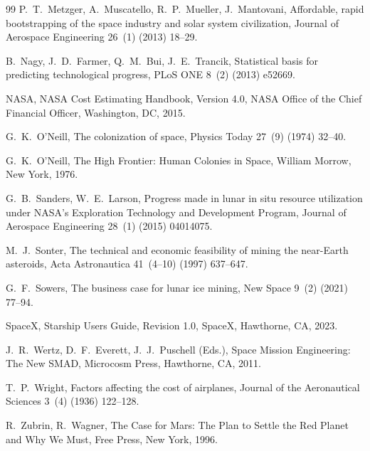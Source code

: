 \documentclass[preprint,12pt]{elsarticle}
\begin{document}
\begin{thebibliography}{99}
P.~T.~Metzger, A.~Muscatello, R.~P.~Mueller, J.~Mantovani,
\newblock Affordable, rapid bootstrapping of the space industry and solar system civilization,
\newblock Journal of Aerospace Engineering 26~(1) (2013) 18--29.

B.~Nagy, J.~D.~Farmer, Q.~M.~Bui, J.~E.~Trancik,
\newblock Statistical basis for predicting technological progress,
\newblock PLoS ONE 8~(2) (2013) e52669.

NASA,
\newblock NASA Cost Estimating Handbook, Version 4.0,
\newblock NASA Office of the Chief Financial Officer, Washington, DC, 2015.

G.~K.~O'Neill,
\newblock The colonization of space,
\newblock Physics Today 27~(9) (1974) 32--40.

G.~K.~O'Neill,
\newblock The High Frontier: Human Colonies in Space,
\newblock William Morrow, New York, 1976.

G.~B.~Sanders, W.~E.~Larson,
\newblock Progress made in lunar in situ resource utilization under NASA's Exploration Technology and Development Program,
\newblock Journal of Aerospace Engineering 28~(1) (2015) 04014075.

M.~J.~Sonter,
\newblock The technical and economic feasibility of mining the near-Earth asteroids,
\newblock Acta Astronautica 41~(4--10) (1997) 637--647.

G.~F.~Sowers,
\newblock The business case for lunar ice mining,
\newblock New Space 9~(2) (2021) 77--94.

SpaceX,
\newblock Starship Users Guide, Revision 1.0,
\newblock SpaceX, Hawthorne, CA, 2023.

J.~R.~Wertz, D.~F.~Everett, J.~J.~Puschell (Eds.),
\newblock Space Mission Engineering: The New SMAD,
\newblock Microcosm Press, Hawthorne, CA, 2011.

T.~P.~Wright,
\newblock Factors affecting the cost of airplanes,
\newblock Journal of the Aeronautical Sciences 3~(4) (1936) 122--128.

R.~Zubrin, R.~Wagner,
\newblock The Case for Mars: The Plan to Settle the Red Planet and Why We Must,
\newblock Free Press, New York, 1996.

\end{thebibliography}
\end{document}
